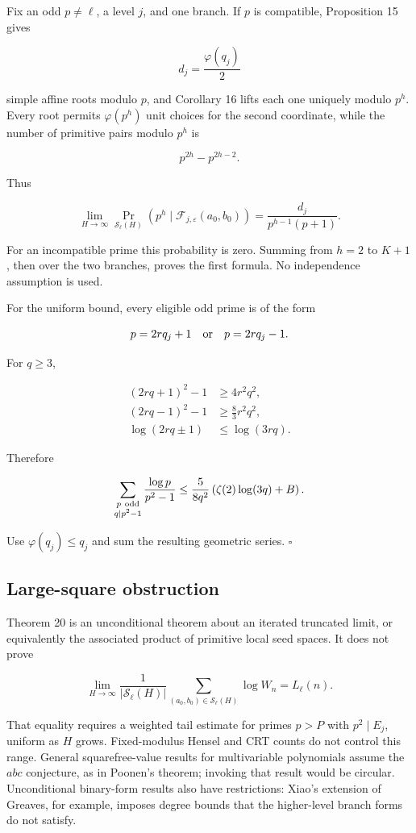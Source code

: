 \documentclass[11pt]{article}
\begin{document}
Fix an odd \(p\ne\ell\), a level \(j\), and one branch. If \(p\) is
compatible, Proposition 15 gives

\[
d_j=\frac{\varphi(q_j)}2
\]

simple affine roots modulo \(p\), and Corollary 16 lifts each one uniquely
modulo \(p^h\). Every root permits \(\varphi(p^h)\) unit choices for the
second coordinate, while the number of primitive pairs modulo \(p^h\) is

\[
p^{2h}-p^{2h-2}.
\]

Thus

\[
\lim_{H\to\infty}
\Pr_{\mathcal S_\ell(H)}
\left(
p^h\mid
\mathcal F_{j,\varepsilon}(a_0,b_0)
\right)
=
\frac{d_j}{p^{h-1}(p+1)}.
\]

For an incompatible prime this probability is zero. Summing from
\(h=2\) to \(K+1\), then over the two branches, proves the first formula.
No independence assumption is used.

For the uniform bound, every eligible odd prime is of the form

\[
p=2rq_j+1
\quad\hbox{or}\quad
p=2rq_j-1.
\]

For \(q\geq3\),

\[
\begin{aligned}
(2rq+1)^2-1&\geq4r^2q^2,\\
(2rq-1)^2-1&\geq\frac83r^2q^2,\\
\log(2rq\pm1)&\leq\log(3rq).
\end{aligned}
\]

Therefore

\[
\sum_{\substack{p\ {\rm odd}\\q\mid p^2-1}}
\frac{\log p}{p^2-1}
\leq
\frac5{8q^2}
\left(
\zeta(2)\log(3q)+B
\right).
\]

Use \(\varphi(q_j)\leq q_j\) and sum the resulting geometric series.
\(\square\)

\subsection{Large-square obstruction}

Theorem 20 is an unconditional theorem about an iterated truncated limit,
or equivalently the associated product of primitive local seed spaces. It
does not prove

\[
\lim_{H\to\infty}
\frac1{|\mathcal S_\ell(H)|}
\sum_{(a_0,b_0)\in\mathcal S_\ell(H)}
\log W_n
=
L_\ell(n).
\]

That equality requires a weighted tail estimate for primes \(p>P\) with
\(p^2\mid E_j\), uniform as \(H\) grows. Fixed-modulus Hensel and CRT
counts do not control this range. General squarefree-value results for
multivariable polynomials assume the \(abc\) conjecture, as in Poonen's
theorem; invoking that result would be circular. Unconditional binary-form
results also have restrictions: Xiao's extension of Greaves, for example,
imposes degree bounds that the higher-level branch forms do not satisfy.
\end{document}
